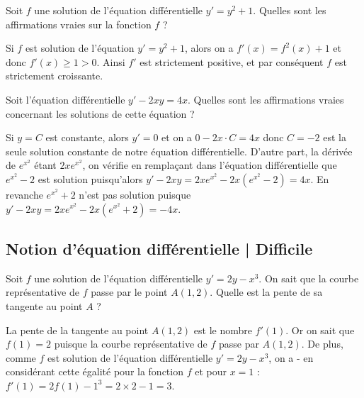 \begin{question}
Soit $f$ une solution de l'équation différentielle $y'=y^2 + 1$.
Quelles sont les affirmations vraies sur la fonction $f$ ?
\begin{answers} 
\end{answers}
\begin{explanations}
Si $f$ est solution de l'équation $y'=y^2 + 1$, alors on a $f'(x) = f^2(x) + 1$ et donc $f'(x) \geq 1 > 0$. Ainsi $f'$ est strictement positive, et par conséquent $f$ est strictement croissante.  
\end{explanations}
\end{question}


\begin{question}
Soit l'équation différentielle $y'- 2xy = 4x$.
Quelles sont les affirmations vraies concernant les solutions de cette équation ?
\begin{answers}  
\end{answers}
\begin{explanations}
Si $y=C$ est constante, alors $y'=0$ et on a $0-2x \cdot C = 4x$ donc $C=-2$ est la seule solution constante de notre équation différentielle. D'autre part, la dérivée de \(e^{x^2}\) étant \(2x e^{x^2}\), on vérifie en remplaçant dans l'équation différentielle que \(e^{x^2}-2\) est solution puisqu'alors $y'-2xy = 2xe^{x^2}-2x(e^{x^2}-2)=4x$. En revanche \(e^{x^2}+2\) n'est pas solution puisque $y'-2xy = 2xe^{x^2}-2x(e^{x^2}+2) = -4x$.
\end{explanations}
\end{question}



\subsection{Notion d'équation différentielle | Difficile}


\begin{question}
Soit \(f\) une solution de l'équation différentielle \(y'=2y-x^3\). On sait que la courbe représentative de \(f\) passe par le point \(A(1,2)\). Quelle est la pente de sa tangente au point \(A\) ?
\begin{answers}  
\end{answers}
\begin{explanations}
La pente de la tangente au point $A(1,2)$ est le nombre $f'(1)$. Or on sait que \(f(1)=2\) puisque la courbe représentative de \(f\) passe par \(A(1,2)\). De plus, comme \(f\) est solution de l'équation différentielle \(y'=2y-x^3\), on a - en considérant cette égalité pour la fonction $f$ et pour $x=1$ : \(f'(1)=2f(1)-1^3=2\times 2 -1=3\).
\end{explanations}
\end{question}


